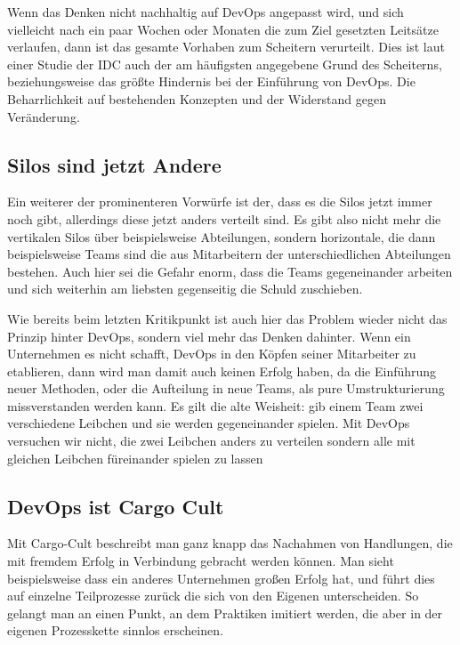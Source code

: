 Wenn das Denken nicht nachhaltig auf \ac{DevOps} angepasst wird, und sich vielleicht nach ein paar Wochen oder Monaten die zum Ziel gesetzten Leitsätze verlaufen, dann ist das gesamte Vorhaben zum Scheitern verurteilt. Dies ist laut einer Studie der \ac{IDC} \cite{idc:2020} auch der am häufigsten angegebene Grund des Scheiterns, beziehungsweise das größte Hindernis bei der Einführung von \ac{DevOps}. Die Beharrlichkeit auf bestehenden Konzepten und der Widerstand gegen Veränderung.

\subsection{Silos sind jetzt Andere}

Ein weiterer der prominenteren Vorwürfe ist der, dass es die Silos jetzt immer noch gibt, allerdings diese jetzt anders verteilt sind. Es gibt also nicht mehr die vertikalen Silos über beispielsweise Abteilungen, sondern horizontale, die dann beispielsweise Teams sind die aus Mitarbeitern der unterschiedlichen Abteilungen bestehen. Auch hier sei die Gefahr enorm, dass die Teams gegeneinander arbeiten und sich weiterhin am liebsten gegenseitig die Schuld zuschieben.

Wie bereits beim letzten Kritikpunkt ist auch hier das Problem wieder nicht das Prinzip hinter \ac{DevOps}, sondern viel mehr das Denken dahinter. Wenn ein Unternehmen es nicht schafft, \ac{DevOps} in den Köpfen seiner Mitarbeiter zu etablieren, dann wird man damit auch keinen Erfolg haben, da die Einführung neuer Methoden, oder die Aufteilung in neue Teams, als pure Umstrukturierung missverstanden werden kann. \glqq Es gilt die alte Weisheit: gib einem Team zwei verschiedene Leibchen und sie werden gegeneinander spielen. Mit \ac{DevOps} versuchen wir nicht, die zwei Leibchen anders zu verteilen sondern alle mit gleichen Leibchen füreinander spielen zu lassen\grqq \cite{halstenberg:2020}

\subsection{DevOps ist Cargo Cult}

Mit Cargo-Cult beschreibt man ganz knapp das Nachahmen von Handlungen, die mit fremdem Erfolg in Verbindung gebracht werden können. Man sieht beispielsweise dass ein anderes Unternehmen großen Erfolg hat, und führt dies auf einzelne Teilprozesse zurück die sich von den Eigenen unterscheiden. So gelangt man an einen Punkt, an dem Praktiken imitiert werden, die aber in der eigenen Prozesskette sinnlos erscheinen.

